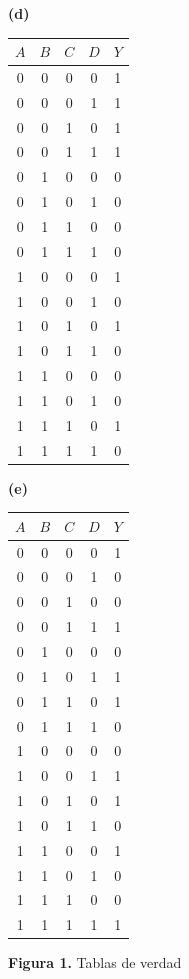 \documentclass[letterpaper,12pt]{article}
\begin{document}
\begin{figure}[h]
\begin{minipage}[t]{0.16\textwidth}
\end{minipage}
\hfill
\begin{minipage}[t]{0.22\textwidth}
    \textbf{(d)} \\
    \begin{tabular}[t]{cccc|c}
    $A$ & $B$ & $C$ & $D$ & $Y$ \\
    \hline
    0 & 0 & 0 & 0 & 1 \\
    0 & 0 & 0 & 1 & 1 \\
    0 & 0 & 1 & 0 & 1 \\
    0 & 0 & 1 & 1 & 1 \\
    0 & 1 & 0 & 0 & 0 \\
    0 & 1 & 0 & 1 & 0 \\
    0 & 1 & 1 & 0 & 0 \\
    0 & 1 & 1 & 1 & 0 \\
    1 & 0 & 0 & 0 & 1 \\
    1 & 0 & 0 & 1 & 0 \\
    1 & 0 & 1 & 0 & 1 \\
    1 & 0 & 1 & 1 & 0 \\
    1 & 1 & 0 & 0 & 0 \\
    1 & 1 & 0 & 1 & 0 \\
    1 & 1 & 1 & 0 & 1 \\
    1 & 1 & 1 & 1 & 0 \\
    \end{tabular}
\end{minipage}
\hfill
\begin{minipage}[t]{0.2\textwidth}
    \textbf{(e)} \\
    \begin{tabular}[t]{cccc|c}
    $A$ & $B$ & $C$ & $D$ & $Y$ \\
    \hline
    0 & 0 & 0 & 0 & 1 \\
    0 & 0 & 0 & 1 & 0 \\
    0 & 0 & 1 & 0 & 0 \\
    0 & 0 & 1 & 1 & 1 \\
    0 & 1 & 0 & 0 & 0 \\
    0 & 1 & 0 & 1 & 1 \\
    0 & 1 & 1 & 0 & 1 \\
    0 & 1 & 1 & 1 & 0 \\
    1 & 0 & 0 & 0 & 0 \\
    1 & 0 & 0 & 1 & 1 \\
    1 & 0 & 1 & 0 & 1 \\
    1 & 0 & 1 & 1 & 0 \\
    1 & 1 & 0 & 0 & 1 \\
    1 & 1 & 0 & 1 & 0 \\
    1 & 1 & 1 & 0 & 0 \\
    1 & 1 & 1 & 1 & 1 \\
    \end{tabular}
\end{minipage}

\vspace{1em}
\centerline{\textbf{Figura 1.} Tablas de verdad}
\end{figure}
\end{document}
